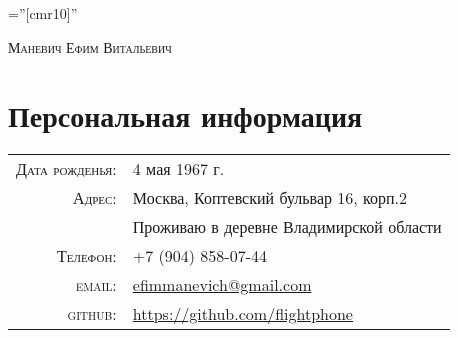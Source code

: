 \documentclass[a4paper,10pt]{article}
\begin{document}

\pagestyle{empty} %

\font\fb=''[cmr10]'' %

\par{\centering
		{\Huge   \textsc{Маневич Ефим Витальевич}
	}\bigskip\par}


\section{Персональная информация}

\begin{tabular}{rl}
    \textsc{Дата рожденья:} &  4 мая 1967 г. \\
    \textsc{Адрес:}   & Москва, Коптевский бульвар 16, корп.2\\
	\textsc{}   & Проживаю в деревне Владимирской области\\
    \textsc{Телефон:}     & +7 (904) 858-07-44\\
    \textsc{email:}     & \href{mailto:efimmanevich@gmail.com}{efimmanevich@gmail.com}\\
    \textsc{github:} & \href{https://github.com/flightphone}{https://github.com/flightphone} \\
    
\end{tabular}

\end{document}
